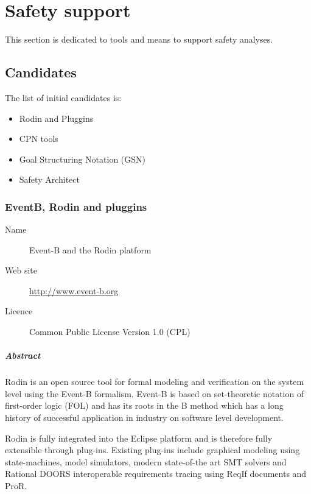 

\chapter{Safety support}
\label{sec:safety}

This section is dedicated to tools and means to support safety analyses.


\section{Candidates}



The list of initial candidates is:

\begin{itemize}
\item Rodin and Pluggins
\item CPN tools
\item Goal Structuring Notation (GSN)
\item Safety Architect
\end{itemize}

\subsection{EventB, Rodin and pluggins}

\begin{description}
\item[Name] Event-B and the Rodin platform
\item[Web site] \url{http://www.event-b.org}
\item[Licence] Common Public License Version 1.0 (CPL)
\end{description}

\paragraph{Abstract}

Rodin is an open source tool for formal modeling and verification on the system
level using the Event-B formalism. Event-B is based on set-theoretic notation of
first-order logic (FOL) and has its roots in the B method which has a long
history of successful application in industry on software level development.

Rodin is fully integrated into the Eclipse platform and is therefore fully
extensible through plug-ins. Existing plug-ins include graphical modeling using
state-machines, model simulators, modern state-of-the art SMT solvers and
Rational DOORS interoperable requirements tracing using ReqIf documents and
ProR.


